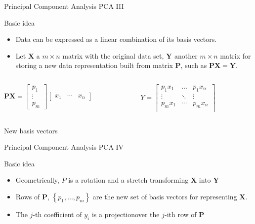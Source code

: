 \documentclass[xcolor=x11names,compress,10pt]{beamer}
\renewcommand{\(}{\begin{columns}}
\renewcommand{\)}{\end{columns}}
\newcommand{\<}[1]{\begin{column}{#1}}
\renewcommand{\>}{\end{column}}
\begin{document}
\begin{frame}{Principal Component Analysis PCA III}
\begin{block}{Basic idea}
\begin{itemize}
	\item Data can be expressed as a linear combination of its basis vectors.
	\item Let $\mathbf{X}$ a $m \times n$ matrix with the original data set, $\mathbf{Y}$ another $m \times n$ matrix for storing a new data representation built from matrix $\mathbf{P}$, such as $\mathbf{PX} = \mathbf{Y}$.
\end{itemize}
\begin{columns}[onlytextwidth]
    \begin{column}{0.45\textwidth}
      \centering
      		$
		\mathbf{PX} =
\begin{bmatrix}
p_1 \\ \vdots \\ p_m
\end{bmatrix}
\begin{bmatrix}
x_1 & \cdots & x_n
\end{bmatrix}
		$
    \end{column}
    \begin{column}{0.45\textwidth}
      \centering
      $
	Y =
\begin{bmatrix}
p_1x_1 & \ldots & p_1x_n\\ 
\vdots & \ddots & \vdots \\ 
p_mx_1 & \cdots & p_mx_n
\\ 

\end{bmatrix}
	$
    \end{column}
    \end{columns}
    {\center \small New basis vectors}
\end{block}
\end{frame}

\begin{frame}{Principal Component Analysis PCA IV}
\begin{block}{Basic idea}
\begin{itemize}
	\item Geometrically, $P$ is a rotation and a stretch transforming $\mathbf{X}$ into $\mathbf{Y}$
	\item Rows of $\mathbf{P}$, $\left \{ p_1,\ldots,p_m \right \}$ are the new set of basis vectors for representing $\mathbf{X}$.
	\item The $j$-th coefficient of $y_i$ is a projectionover the  $j$-ith row of $\mathbf{P}$
\end{itemize}
\end{block}
\end{frame}
\end{document}

